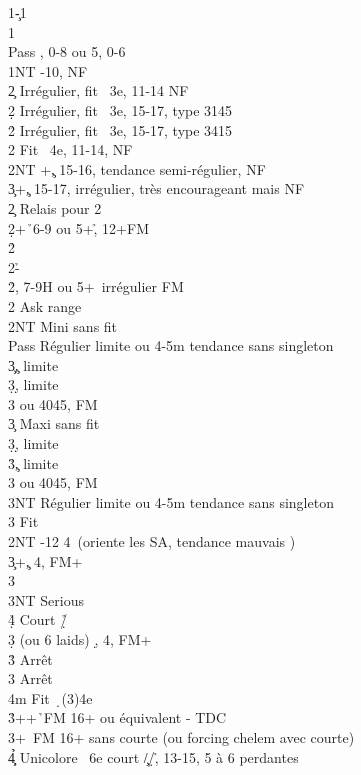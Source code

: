 \documentclass[a4paper]{article}
\begin{document}
\begin{bidtable}
1\c-1\h\\
1\s\+\\
Pass \s , 0-8 ou 5\s , 0-6\\
1NT -10, NF\+\\
2\c \> Irrégulier, fit \s\ 3e, 11-14 NF\\
2\d \> Irrégulier, fit \s\ 3e, 15-17, type 3145\\
2\h \> Irrégulier, fit \s\ 3e, 15-17, type 3415\\
2\s \> Fit \s\ 4e, 11-14, NF\\
2NT +\c , 15-16, tendance semi-régulier, NF\\
3\c {}+\c , 15-17, irrégulier, très encourageant mais NF\-\\
2\c \> Relais pour 2\d \\
2\d {}+\h\ 6-9 ou 5+\h , 12+FM\+\\
2\h {}\h \\
2\s {}-\h \-\\
2\h {}\s , 7-9H ou 5+\s\ irrégulier FM\\
2\s \> Ask range\+\\
2NT \> Mini sans fit \s \+\\
Pass \> Régulier limite ou 4\s -5m tendance sans singleton\\
3\c {}\c , limite\\
3\d {}\d , limite\\
3\s {} ou 4045, FM\-\\
3\c \> Maxi sans fit \s \+\\
3\d {}\d , limite\\
3\h {}\c , limite\\
3\s {} ou 4045, FM\\
3NT \> Régulier limite ou 4\s -5m tendance sans singleton\-\\
3\s \> Fit \s \-\\
2NT -12 4\s\ (oriente les SA, tendance mauvais \s )\\
3\c {}+\c , 4\s , FM+\+\\
3\s {}\s \+\\
3NT \> Serious\\
4\d\h \> Court \d /\h \-\-\\
3\d {} (ou 6 laids) \d , 4\s , FM+\+\\
3\h \> Arrêt \h \\
3\s \> Arrêt \c \\
4m \> Fit \d\ (3)4e\-\\
3\h {}++\h\ FM 16+ ou équivalent - TDC\\
3\s {}+\s\ FM 16+ sans courte (ou forcing chelem avec courte)\\
4\c\d\h \> Unicolore \s\ 6e court \c /\d /\h , 13-15, 5 à 6 perdantes\-
\end{bidtable}
\end{document}
